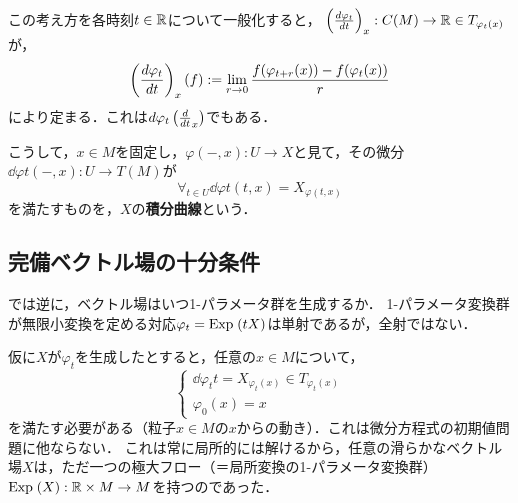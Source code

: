 \documentclass[uplatex,dvipdfmx]{jsreport}
\begin{document}
\begin{definition}
    この考え方を各時刻$t\in\mathbb{R}$について一般化すると，
    $\left(\frac{d \varphi_t}{d t}\right)_x:C(M)\to\mathbb{R}\in T_{\varphi_t(x)}$が，
    \[\left(\frac{d \varphi_t}{d t}\right)_x(f):=\lim_{r\to 0}\frac{f(\varphi_{t+r}(x))-f(\varphi_t(x))}{r}\]
    により定まる．これは$d\varphi_t\left(\frac{d}{dt}_x\right)$でもある．

    こうして，$x\in M$を固定し，$\varphi(-,x):U\to X$と見て，その微分$\dd{\varphi}{t}(-,x):U\to T(M)$が
    \[\forall_{t\in U}\dd{\varphi}{t}(t,x)=X_{\varphi(t,x)}\]
    を満たすものを，$X$の\textbf{積分曲線}という．
\end{definition}

\subsection{完備ベクトル場の十分条件}

\begin{problem}
    では逆に，ベクトル場はいつ1-パラメータ群を生成するか．
    1-パラメータ変換群が無限小変換を定める対応$\varphi_t=\mathrm{Exp}\;(tX)$は単射であるが，全射ではない．
\end{problem}
\begin{discussion}
    仮に$X$が$\varphi_t$を生成したとすると，任意の$x\in M$について，
    \[\begin{cases}
        \dd{\varphi_t}{t}=X_{\varphi_t(x)}\in T_{\varphi_t(x)}\\
        \varphi_0(x)=x
    \end{cases}\]
    を満たす必要がある（粒子$x\in M$の$x$からの動き）．これは微分方程式の初期値問題に他ならない．
    これは常に局所的には解けるから，任意の滑らかなベクトル場$X$は，ただ一つの極大フロー（＝局所変換の1-パラメータ変換群）$\mathrm{Exp}\;(X):\mathbb{R}\times M\to M$を持つのであった．
\end{discussion}
\end{document}
